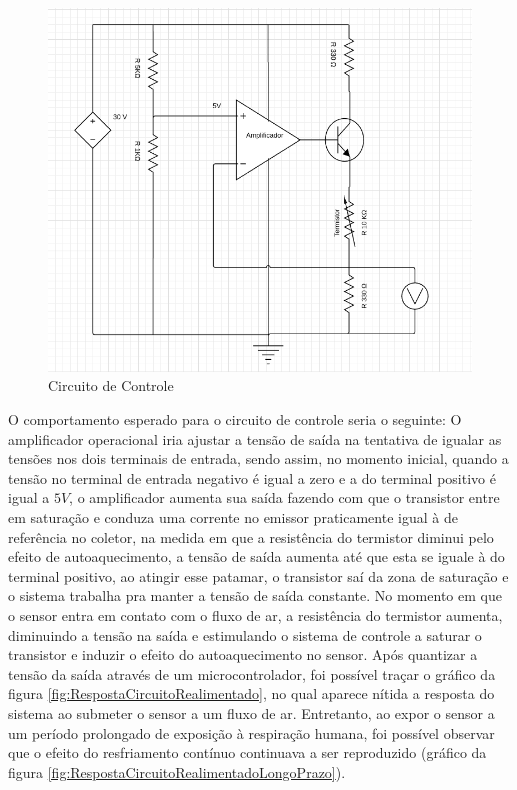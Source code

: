 \begin{figure}[h!]
	\begin{center}
		\includegraphics[width=1\linewidth]{images/Circuito_de_controle.png}
		\caption{Circuito de Controle}
		\label{fig:circuitoRealimentado}
	\end{center}
\end{figure}

O comportamento esperado para o circuito de controle seria o seguinte: O amplificador operacional iria ajustar a tensão de saída na tentativa de igualar as tensões nos dois terminais de entrada, sendo assim, no momento inicial, quando a tensão no terminal de entrada negativo é igual a zero e a do terminal positivo é igual a $5V$, o amplificador aumenta sua saída fazendo com que o transistor entre em saturação e conduza uma corrente no emissor praticamente igual à de referência no coletor, na medida em que a resistência do termistor diminui pelo efeito de autoaquecimento, a tensão de saída aumenta até que esta se iguale à do terminal positivo, ao atingir esse patamar, o transistor saí da zona de saturação e o sistema trabalha pra manter a tensão de saída constante. No momento em que o sensor entra em contato com o fluxo de ar, a resistência do termistor aumenta, diminuindo a tensão na saída e estimulando o sistema de controle a saturar o transistor e induzir o efeito do autoaquecimento no sensor. Após quantizar a tensão da saída através de um microcontrolador, foi possível traçar o gráfico da figura \ref{fig:RespostaCircuitoRealimentado}, no qual aparece nítida a resposta do sistema ao submeter o sensor a um fluxo de ar. Entretanto, ao expor o sensor a um período prolongado de exposição à respiração humana, foi possível observar que o efeito do resfriamento contínuo continuava a ser reproduzido (gráfico da figura \ref{fig:RespostaCircuitoRealimentadoLongoPrazo}).



